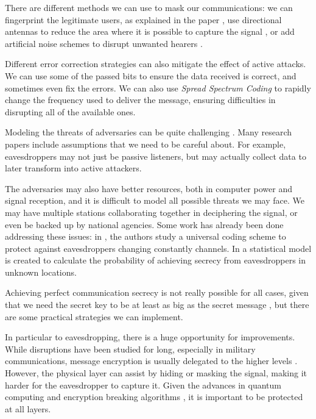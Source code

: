 There are different methods we can use to mask our communications: we can fingerprint the legitimate users, as explained in the paper \cite{228fe14543ce4cefba3bb9cc11741362}, use directional antennas to reduce the area where it is possible to capture the signal \cite{4543070}, or add artificial noise schemes to disrupt unwanted hearers \cite{1605889}.

Different error correction strategies can also mitigate the effect of active attacks. We can use some of the passed bits to ensure the data received is correct, and sometimes even fix the errors. We can also use \textit{Spread Spectrum Coding} to rapidly change the frequency used to deliver the message, ensuring difficulties in disrupting all of the available ones.


Modeling the threats of adversaries can be quite challenging \cite{7120011}. Many research papers include assumptions that we need to be careful about. For example, eavesdroppers may not just be passive listeners, but may actually collect data to later transform into active attackers.

The adversaries may also have better resources, both in computer power and signal reception, and it is difficult to model all possible threats we may face. We may have multiple stations collaborating together in deciphering the signal, or even be backed up by national agencies. Some work has already been done addressing these issues: in \cite{5707054}, the authors study a universal coding scheme to protect against eavesdroppers changing constantly channels. In \cite{7543509} a statistical model is created to calculate the probability of achieving secrecy from eavesdroppers in unknown locations.


Achieving perfect communication secrecy is not really possible for all cases, given that we need the secret key to be at least as big as the secret message \cite{6769090}, but there are some practical strategies we can implement.

In particular to eavesdropping, there is a huge opportunity for improvements. While disruptions have been studied for long, especially in military communications, message encryption is usually delegated to the higher levels \cite{6739367}. However, the physical layer can assist by hiding or masking the signal, making it harder for the eavesdropper to capture it. Given the advances in quantum computing and encryption breaking algorithms \cite{365700}, it is important to be protected at all layers.

